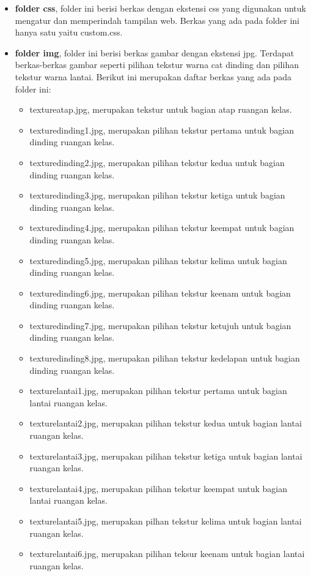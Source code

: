 \begin{itemize}
	\item {\bf folder css}, folder ini berisi berkas dengan ekstensi css yang digunakan untuk mengatur dan memperindah tampilan web. Berkas yang ada pada folder ini hanya satu yaitu custom.css.
	\item {\bf folder img}, folder ini berisi berkas gambar dengan ekstensi jpg. Terdapat berkas-berkas gambar seperti pilihan tekstur warna cat dinding dan pilihan tekstur warna lantai. Berikut ini merupakan daftar berkas yang ada pada folder ini:
	\begin{itemize}
		\item textureatap.jpg, merupakan tekstur untuk bagian atap ruangan kelas.
		\item texturedinding1.jpg, merupakan pilihan tekstur pertama untuk bagian dinding ruangan kelas.
		\item texturedinding2.jpg, merupakan pilihan tekstur kedua untuk bagian dinding ruangan kelas.
		\item texturedinding3.jpg, merupakan pilihan tekstur ketiga untuk bagian dinding ruangan kelas.
		\item texturedinding4.jpg, merupakan pilihan tekstur keempat untuk bagian dinding ruangan kelas.
		\item texturedinding5.jpg, merupakan pilihan tekstur kelima untuk bagian dinding ruangan kelas.
		\item texturedinding6.jpg, merupakan pilihan tekstur keenam untuk bagian dinding ruangan kelas.
		\item texturedinding7.jpg, merupakan pilihan tekstur ketujuh untuk bagian dinding ruangan kelas.
		\item texturedinding8.jpg, merupakan pilihan tekstur kedelapan untuk bagian dinding ruangan kelas.
		\item texturelantai1.jpg, merupakan pilihan tekstur pertama untuk bagian lantai ruangan kelas.
		\item texturelantai2.jpg, merupakan pilihan tekstur kedua untuk bagian lantai ruangan kelas.
		\item texturelantai3.jpg, merupakan pilihan tekstur ketiga untuk bagian lantai ruangan kelas.
		\item texturelantai4.jpg, merupakan pilihan tekstur keempat untuk bagian lantai ruangan kelas.
		\item texturelantai5.jpg, merupakan pilhan tekstur kelima untuk bagian lantai ruangan kelas.
		\item texturelantai6.jpg, merupakan pilihan teksur keenam untuk bagian lantai ruangan kelas.

\end{itemize}
\end{itemize}
